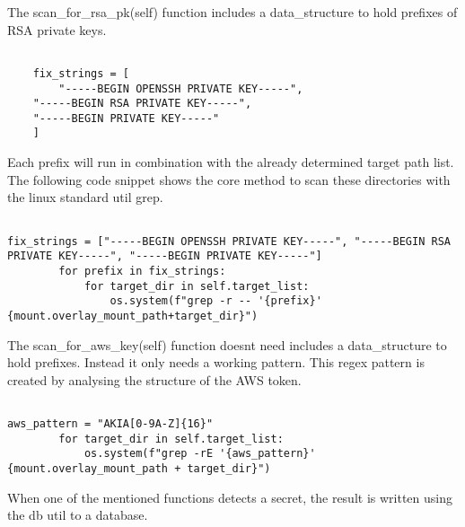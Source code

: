 The scan\_for\_rsa\_pk(self) function includes a data\_structure to hold prefixes of RSA private keys.
\lstset{language=Python}          %
\begin{lstlisting}[]  % Start your code-block
	
    fix_strings = [
    	"-----BEGIN OPENSSH PRIVATE KEY-----",
	"-----BEGIN RSA PRIVATE KEY-----",
	"-----BEGIN PRIVATE KEY-----"
	]
\end{lstlisting}
Each prefix will run in combination with the already determined target path list.
The following code snippet shows the core method to scan these directories with the linux standard util grep.
\lstset{language=Python}          %
\begin{lstlisting}[]  % Start your code-block
	
fix_strings = ["-----BEGIN OPENSSH PRIVATE KEY-----", "-----BEGIN RSA PRIVATE KEY-----", "-----BEGIN PRIVATE KEY-----"]
        for prefix in fix_strings:
            for target_dir in self.target_list:
                os.system(f"grep -r -- '{prefix}' {mount.overlay_mount_path+target_dir}")

\end{lstlisting}

The scan\_for\_aws\_key(self) function doesnt need includes a data\_structure to hold prefixes. Instead it only needs a working pattern.
This regex pattern is created by analysing the structure of the AWS token.	

\lstset{language=Python}          %
\begin{lstlisting}[]  % Start your code-block
	
aws_pattern = "AKIA[0-9A-Z]{16}"
        for target_dir in self.target_list:
            os.system(f"grep -rE '{aws_pattern}' {mount.overlay_mount_path + target_dir}")
\end{lstlisting}

When one of the mentioned functions detects a secret, the result is written using the db util to a database.



